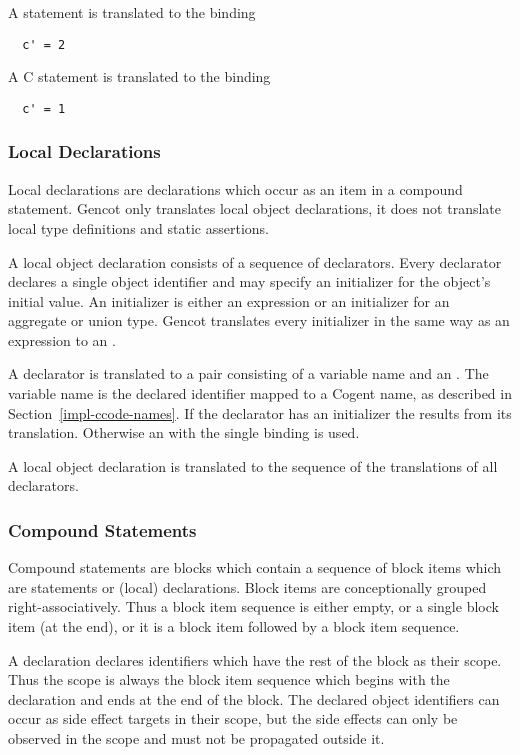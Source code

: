 A  statement is translated to the binding
\begin{verbatim}
  c' = 2
\end{verbatim}

A C  statement is translated to the binding
\begin{verbatim}
  c' = 1
\end{verbatim}

\subsubsection{Local Declarations}

Local declarations are declarations which occur as an item in a compound statement. Gencot only translates local object declarations, 
it does not translate local type definitions and static assertions. 

A local object declaration consists of a sequence of declarators. Every declarator declares a single object identifier and may 
specify an initializer for the object's initial value. An initializer is either an expression or an initializer for an aggregate or
union type. Gencot translates every initializer in the same way as an expression to an .

A declarator is translated to a pair consisting of a variable name and an . The variable name is the declared identifier
mapped to a Cogent name, as described in Section~\ref{impl-ccode-names}. If the declarator has an initializer the 
results from its translation. Otherwise an  with the single binding  is used.

A local object declaration is translated to the sequence of the translations of all declarators.

\subsubsection{Compound Statements}

Compound statements are blocks which contain a sequence of block items which are statements or (local) declarations. Block items 
are conceptionally grouped right-associatively. Thus a block item sequence is either empty, or a single block item
(at the end), or it is a block item followed by a block item sequence.

A declaration declares identifiers which have the rest of the block as their scope. Thus the scope is always the block item sequence
which begins with the declaration and ends at the end of the block. The declared object identifiers can occur as side
effect targets in their scope, but the side effects can only be observed in the scope and must not be propagated outside it.

